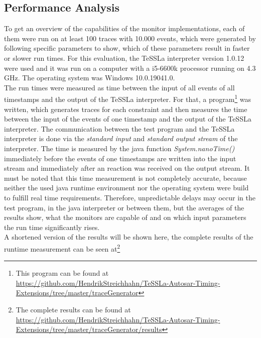 \subsection{Performance Analysis}
\label{sec:performance}
To get an overview of the capabilities of the monitor implementations, each of them were run on at least 100 traces with 10.000 events, which were generated by following specific parameters to show, which of these parameters result in faster or slower run times. For this evaluation, the TeSSLa interpreter version 1.0.12 were used and it was run on a computer with a i5-6600k processor running on 4.3 GHz. The operating system was Windows 10.0.19041.0.\\
The run times were measured as time between the input of all events of all timestamps and the output of the TeSSLa interpreter. For that, a program\footnote{This program can be found at \href{https://github.com/HendrikStreichhahn/TeSSLa-Autosar-Timing-Extensions/tree/master/traceGenerator}{https://github.com/HendrikStreichhahn/TeSSLa-Autosar-Timing-Extensions/tree/master/traceGenerator}} was written, which generates traces for each constraint and then measures the time between the input of the events of one timestamp and the output of the TeSSLa interpreter. The communication between the test program and the TeSSLa interpreter is done via the \textit{standard input} and \textit{standard output stream} of the interpreter. The time is measured by the java function \textit{System.nanoTime()} immediately before the events of one timestamps are written into the input stream and immediately after an reaction was received on the output stream. It must be noted that this time measurement is not completely accurate, because neither the used java runtime environment nor the operating system were build to fulfill real time requirements. Therefore, unpredictable delays may occur in the test program, in the java interpreter or between them, but the averages of the results show, what the monitors are capable of and on which input parameters the run time significantly rises.\\
A shortened version of the results will be shown here, the complete results of the runtime measurement can be seen at\footnote{The complete results can be found at  \href{https://github.com/HendrikStreichhahn/TeSSLa-Autosar-Timing-Extensions/tree/master/traceGenerator/results}{https://github.com/HendrikStreichhahn/TeSSLa-Autosar-Timing-Extensions/tree/master/traceGenerator/results}}


